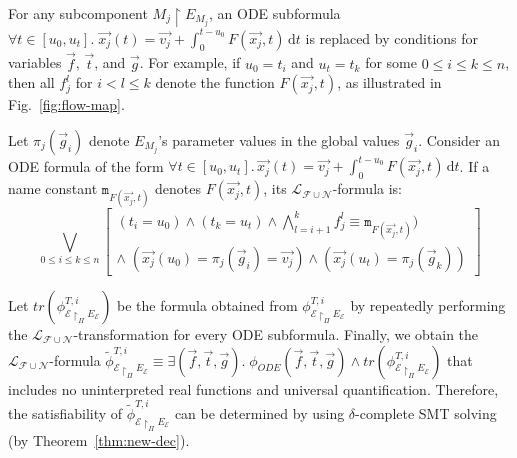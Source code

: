 For any subcomponent $M_j \restriction E_{M_j}$,
an ODE subformula $\forall t \in [u_0,u_t].\; \vec{x_j}(t) = \vec{v_j} + \int_0^{t-u_0} \!  F(\vec{x_j},t)\,\mathrm{d}t$ 
is replaced by conditions for variables  $\vec{f}$, $\vec{t}$, and $\vec{g}$.
For example, if $u_0 = t_i$ and $u_t = t_k$ for some $0 \leq i \leq k \leq n$,
then all $f_j^l$ for $i < l \leq k$ 
denote
the function $F(\vec{x_j},t)$,
as illustrated in Fig.~\ref{fig:flow-map}.


\begin{definition}\label{def:ode-trans}
Let  $\pi_j(\vec{g}_i)$ denote $E_{M_j}$'s parameter values 
in the global values $\vec{g}_i$. %
Consider an ODE formula %
of the form 
$\forall t \in [u_0,u_t].\, \vec{x_j}(t) = \vec{v_j} + \int_0^{t-u_0} \!  F(\vec{x_j},t)\,\mathrm{d}t$.
If a name constant $\mathtt{m}_{F(\vec{x_j},t)}$ denotes $F(\vec{x_j},t)$,
its $\mathcal{L}_{\mathcal{F}\cup\mathcal{N}}$-formula is: %
\[
\bigvee_{0 \leq i \leq k \leq n} 
\left[
\begin{aligned}
(t_i = u_0) \wedge (t_k = u_t) \wedge \textstyle\bigwedge_{l=i+1}^{k} f^l_j \equiv \mathtt{m}_{F(\vec{x_j},t)}  )
\\
\wedge\; (\vec{x_j}(u_0) = \pi_j(\vec{g}_i) = \vec{v_j}) \wedge  (\vec{x_j}(u_t) = \pi_j(\vec{g}_k))
\end{aligned}
\right]
\]
\end{definition}

Let $\mathit{tr}(\phi_{\mathcal{E} \restriction_{\Pi} E_\mathcal{E}}^{T,i})$ 
be the formula
obtained from $\phi_{\mathcal{E} \restriction_{\Pi} E_\mathcal{E}}^{T,i}$ 
by repeatedly performing the $\mathcal{L}_{\mathcal{F}\cup\mathcal{N}}$-transformation
for every ODE subformula.
Finally, we obtain the $\mathcal{L}_{\mathcal{F}\cup\mathcal{N}}$-formula 
$\tilde{\phi}_{\mathcal{E} \restriction_{\Pi} E_\mathcal{E}}^{T,i}
\equiv
\exists (\vec{f}, \vec{t}, \vec{g}).\; \phi_{\mathit{ODE}}(\vec{f},\vec{t},\vec{g}) \wedge \mathit{tr}(\phi_{\mathcal{E} \restriction_{\Pi} E_\mathcal{E}}^{T,i})$
that includes no uninterpreted real functions and universal quantification.
Therefore, the  satisfiability of $\tilde{\phi}_{\mathcal{E} \restriction_{\Pi} E_\mathcal{E}}^{T,i}$ can be determined by using
$\delta$-complete SMT solving (by Theorem~\ref{thm:new-dec}).


